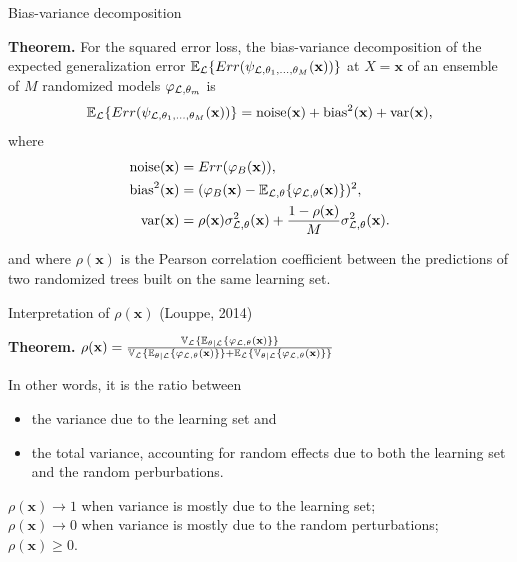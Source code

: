 \documentclass{beamer}
\begin{document}
\begin{frame}{Bias-variance decomposition}

{\bf Theorem.}
For the squared error loss, the bias-variance decomposition of the expected
generalization error $\mathbb{E}_{\cal L} \{ Err( \psi_{{\cal L},\theta_1,\dots,\theta_M}(\mathbf{x}))
\}$ at $X=\mathbf{x}$ of an ensemble of $M$ randomized models $\varphi_{{\cal L},\theta_m}$ is
\begin{equation*}
\mathbb{E}_{\cal L} \{ Err(\psi_{{\cal L},\theta_1,\dots,\theta_M}(\mathbf{x})) \} = \text{noise}(\mathbf{x}) + \text{bias}^2(\mathbf{x}) + \text{var}(\mathbf{x}),
\end{equation*}
where
\begin{align*}
\text{noise}(\mathbf{x}) &= Err(\varphi_B(\mathbf{x})), \\
\text{bias}^2(\mathbf{x}) &= (\varphi_B(\mathbf{x}) - \mathbb{E}_{{\cal L},\theta} \{ \varphi_{{\cal L},\theta}(\mathbf{x}) \} )^2, \\
\text{var}(\mathbf{x}) &= \rho(\mathbf{x}) \sigma^2_{{\cal L},\theta}(\mathbf{x}) + \frac{1 - \rho(\mathbf{x})}{M} \sigma^2_{{\cal L},\theta}(\mathbf{x}).
\end{align*}

and where $\rho(\mathbf{x})$ is the Pearson correlation coefficient between
the predictions of two randomized trees built on the same learning set.

\end{frame}

\begin{frame}{Interpretation of $\rho(\mathbf{x})$ {\scriptsize (Louppe, 2014)}}

{\bf Theorem.} $\rho(\mathbf{x}) = \frac{\mathbb{V}_{\cal L} \{ \mathbb{E}_{\theta|{\cal L}} \{ \varphi_{{\cal L},\theta}(\mathbf{x}) \} \}}{\mathbb{V}_{\cal L} \{ \mathbb{E}_{\theta|{\cal L}} \{ \varphi_{{\cal L},\theta}(\mathbf{x}) \} \} + \mathbb{E}_{\cal L} \{ \mathbb{V}_{\theta|{\cal L}} \{ \varphi_{{\cal L},\theta}(\mathbf{x}) \} \}}$

\vspace{1cm}

In other words, it is the ratio between
\begin{itemize}
\item the variance due to the learning set and
\item the total variance, accounting for random effects due to both the
  learning set and the random perburbations.
\end{itemize}

\bigskip

$\rho(\mathbf{x}) \to 1$ when variance is mostly due to the learning set; \\
$\rho(\mathbf{x}) \to 0$ when variance is mostly due to the random perturbations;\\
$\rho(\mathbf{x}) \geq 0$.


\end{frame}
\end{document}
